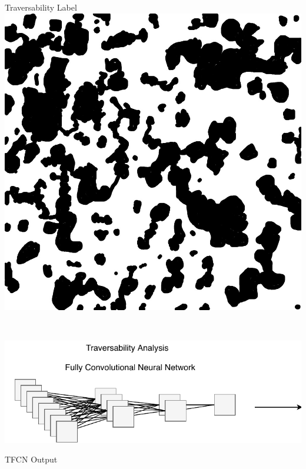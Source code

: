 \documentclass[usenames,dvipsnames,10pt]{beamer}
\begin{document}
\begin{frame}
\begin{minipage}[]{0.3\textwidth}
\end{minipage}
\hspace{0.25cm}
\begin{minipage}[]{0.3\textwidth}
	\centering
	Traversability Label
	\includegraphics[width=\textwidth]{graphics/aerial08-trav.jpg}
\end{minipage} \\
\vspace{0.25cm}
\begin{minipage}[]{0.666\textwidth}
	\includegraphics[width=\textwidth]{graphics/tfcn2.pdf}
\end{minipage}
\begin{minipage}[]{0.3\textwidth}
	\centering
	TFCN Output

\end{minipage}
\end{frame}
\end{document}
